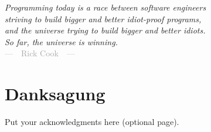 
\begin{flushright}{\slshape
    Programming today is a race between software engineers \\
    striving to build bigger and better idiot-proof programs, \\
    and the universe trying to build bigger and better idiots. \\
    So far, the universe is winning. } \\ \medskip
    \textcolor{darkgray}{---~~Rick Cook~~---}
\end{flushright}



\bigskip

\begingroup
\let\clearpage\relax
\let\cleardoublepage\relax
\let\cleardoublepage\relax
\chapter*{Danksagung}
Put your acknowledgments here (optional page).


\endgroup

